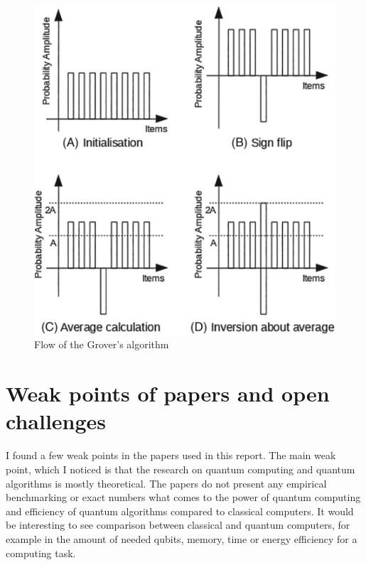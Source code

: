 \documentclass[english,oneside,openright]{UH_DS_report}
\begin{document}
\begin{figure}[h]
\caption{Flow of the Grover's algorithm}
\label{groverflow}
\centering
\includegraphics[width=\linewidth]{images/grover-flow.png}
\end{figure}

\chapter{Weak points of papers and open challenges}
\label{chapter:weakpoints}

I found a few weak points in the papers used in this report. The main weak point, which I noticed is that the research on quantum computing and quantum algorithms is mostly theoretical. The papers do not present any empirical benchmarking or exact numbers what comes to the power of quantum computing and efficiency of quantum algorithms compared to classical computers. It would be interesting to see comparison between classical and quantum computers, for example in the amount of needed qubits, memory, time or energy efficiency for a computing task.
\end{document}
